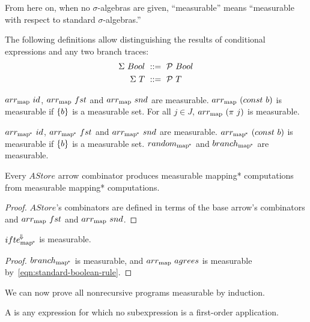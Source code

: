 From here on, when no $\sigma$-algebras are given, ``measurable'' means ``measurable with respect to standard $\sigma$-algebras.''

The following definitions allow distinguishing the results of conditional expressions and any two branch traces:
\begin{align}
	\Sigma~Bool &\ ::=\ \mathcal{P}~Bool
	\label{eqn:standard-boolean-rule}
\\
	\Sigma~T &\ ::=\ \mathcal{P}~T
	\label{eqn:standard-traces-rule}
\end{align}

\begin{lemma}
$arr_\mathrm{map}~id$, $arr_\mathrm{map}~fst$ and $arr_\mathrm{map}~snd$ are measurable.
$arr_\mathrm{map}~(const~b)$ is measurable if $\{{b}\}$ is a measurable set.
For all $j \in J$, $arr_\mathrm{map}~(\pi~j)$ is measurable.
\end{lemma}


\begin{corollary}
$arr_\mathrm{map^{\mspace{-2mu}*}}~id$, $arr_\mathrm{map^{\mspace{-2mu}*}}~fst$ and $arr_\mathrm{map^{\mspace{-2mu}*}}~snd$ are measurable.
$arr_\mathrm{map^{\mspace{-2mu}*}}~(const~b)$ is measurable if $\{{b}\}$ is a measurable set.
$random_\mathrm{map^{\mspace{-2mu}*}}$ and $branch_\mathrm{map^{\mspace{-2mu}*}}$ are measurable.
\end{corollary}

\begin{theorem}
\label{thm:astore-measurability-transfer}
Every $AStore$ arrow combinator produces measurable mapping* computations from measurable mapping* computations.%
\end{theorem}
\begin{proof}
$AStore$'s combinators are defined in terms of the base arrow's combinators and $arr_\mathrm{map}~fst$ and $arr_\mathrm{map}~snd$.
\end{proof}

\begin{theorem}
$ifte^{\mspace{-2mu}\Downarrow\mspace{-2mu}}_\mathrm{map^{\mspace{-2mu}*}}$ is measurable.
\end{theorem}
\begin{proof}
$branch_\mathrm{map^{\mspace{-2mu}*}}$ is measurable, and $arr_\mathrm{map}~agrees$ is measurable by~\eqref{eqn:standard-boolean-rule}.
\end{proof}

We can now prove all nonrecursive programs measurable by induction.

\begin{definition}
\label{def:finite-expression}
A  is any expression for which no subexpression is a first-order application.%
\end{definition}

